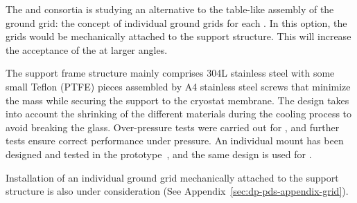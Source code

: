 
The  and \dual {} consortia is studying an alternative to the table-like assembly of the ground grid: the concept of individual ground grids for each . In this option, the grids would be mechanically attached to the support structure. This will increase the acceptance of the  at larger angles.

The support frame structure mainly comprises \num{304}L stainless steel with some small Teflon (PTFE) pieces assembled by A4 stainless steel screws that minimize the mass while securing the  support to the cryostat membrane. The design %
takes into account the shrinking of the different materials during the cooling process to avoid breaking the  glass.
Over-pressure tests were carried out for , and further tests ensure correct performance under pressure. An individual  mount has been designed and tested in the   prototype~\cite{Zambelli:2017dkg}, and the same design is used for .

Installation of an individual ground grid mechanically attached to the  support structure is also under consideration (See Appendix~\ref{sec:dp-pds-appendix-grid}).



